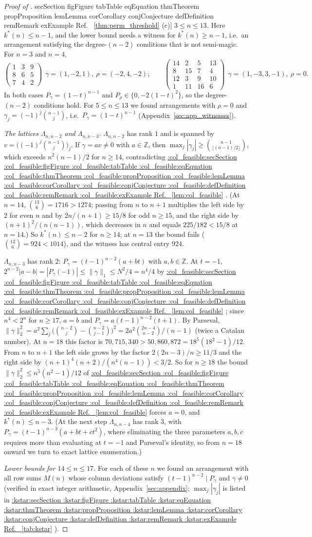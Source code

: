 \documentclass[11pt,a4paper]{article}
\makeatletter
\def\Cref@getprefix#1:#2\relax{#1}
\def\Cref@prefix@sec{sec}
\def\Cref@prefix@fig{fig}
\def\Cref@prefix@tab{tab}
\def\Cref@prefix@eq{eq}
\def\Cref@prefix@thm{thm}
\def\Cref@prefix@prop{prop}
\def\Cref@prefix@lem{lem}
\def\Cref@prefix@cor{cor}
\def\Cref@prefix@conj{conj}
\def\Cref@prefix@def{def}
\def\Cref@prefix@rem{rem}
\def\Cref@prefix@ex{ex}
\def\Cref@type@cap#1{%
  \edef\Cref@tmp{#1}%
  \ifx\Cref@tmp\Cref@prefix@sec Section%
  \else\ifx\Cref@tmp\Cref@prefix@fig Figure%
  \else\ifx\Cref@tmp\Cref@prefix@tab Table%
  \else\ifx\Cref@tmp\Cref@prefix@eq Equation%
  \else\ifx\Cref@tmp\Cref@prefix@thm Theorem%
  \else\ifx\Cref@tmp\Cref@prefix@prop Proposition%
  \else\ifx\Cref@tmp\Cref@prefix@lem Lemma%
  \else\ifx\Cref@tmp\Cref@prefix@cor Corollary%
  \else\ifx\Cref@tmp\Cref@prefix@conj Conjecture%
  \else\ifx\Cref@tmp\Cref@prefix@def Definition%
  \else\ifx\Cref@tmp\Cref@prefix@rem Remark%
  \else\ifx\Cref@tmp\Cref@prefix@ex Example%
  \else Ref.%
  \fi\fi\fi\fi\fi\fi\fi\fi\fi\fi\fi\fi
}
\DeclareRobustCommand{\Cref}[1]{%
  \begingroup
  \edef\Cref@label{#1}%
  \edef\Cref@prefix{\expandafter\Cref@getprefix\Cref@label:\relax}%
  \hyperref[#1]{\Cref@type@cap{\Cref@prefix}~\ref*{#1}}%
  \endgroup
}
\theoremstyle{plain}
\theoremstyle{definition}
\theoremstyle{remark}
\newcommand{\Z}{\mathbb{Z}}
\makeatother
\begin{document}
\begin{proof}[Proof of \Cref{thm:perm_threshold}(c)]
\emph{$3\le n\le13$.}  Here $k^*(n)\le n-1$, and the lower bound needs a witness for $k^*(n)\ge n-1$, i.e.\ an arrangement satisfying the degree-$(n-2)$ conditions that is not semi-magic.  For $n=3$ and $n=4$,
\[
\begin{pmatrix}1&3&9\\8&6&5\\7&4&2\end{pmatrix}\ \ \gamma=(1,-2,1),\ \rho=(-2,4,-2);\qquad
\begin{pmatrix}14&2&5&13\\8&15&7&4\\12&3&9&10\\1&11&16&6\end{pmatrix}\ \ \gamma=(1,-3,3,-1),\ \rho=0.
\]
In both cases $P_\gamma=(1-t)^{n-1}$ and $P_\rho\in\{0,-2(1-t)^2\}$, so the degree-$(n-2)$ conditions hold.
For $5\le n\le13$ we found arrangements with $\rho=0$ and $\gamma_j=(-1)^j\binom{n-1}j$, i.e.\ $P_\gamma=(1-t)^{n-1}$ (Appendix~\ref{sec:app_witnesses}).

\emph{The lattices $\Lambda_{n,n-2}$ and $\Lambda_{n,n-3}$.}  $\Lambda_{n,n-2}$ has rank $1$ and is spanned by $v=\bigl((-1)^j\binom{n-1}j\bigr)_j$.  If $\gamma=av\ne0$ with $a\in\Z$, then $\max_j|\gamma_j|\ge\binom{n-1}{\lfloor(n-1)/2\rfloor}$, which exceeds $n^2(n-1)/2$ for $n\ge14$, contradicting \Cref{lem:col_feasible}.
(At $n=14$, $\binom{13}6=1716>1274$; passing from $n$ to $n+1$ multiplies the left side by $2$ for even $n$ and by $2n/(n+1)\ge15/8$ for odd $n\ge15$, and the right side by $(n+1)^2/(n(n-1))$, which decreases in $n$ and equals $225/182<15/8$ at $n=14$.)
So $k^*(n)\le n-2$ for $n\ge14$; at $n=13$ the bound fails ($\binom{12}6=924<1014$), and the witness has central entry $924$.

$\Lambda_{n,n-3}$ has rank $2$: $P_\gamma=(t-1)^{n-2}(a+bt)$ with $a,b\in\Z$.
At $t=-1$, $2^{n-2}|a-b|=|P_\gamma(-1)|\le\|\gamma\|_1\le N^2/4=n^4/4$ by \Cref{lem:col_feasible}; since $n^4<2^n$ for $n\ge17$, $a=b$ and $P_\gamma=a(t-1)^{n-2}(t+1)$.
By Parseval, $\|\gamma\|_2^2=a^2\sum_j\bigl(\binom{n-2}j-\binom{n-2}{j-1}\bigr)^2=2a^2\binom{2n-4}{n-2}/(n-1)$ (twice a Catalan number).
At $n=18$ this factor is $70{,}715{,}340>50{,}860{,}872=18^5(18^2-1)/12$.
From $n$ to $n+1$ the left side grows by the factor $2(2n-3)/n\ge11/3$ and the right side by $(n+1)^4(n+2)/(n^4(n-1))<3/2$.
So for $n\ge18$ the bound $\|\gamma\|_2^2\le n^5(n^2-1)/12$ of \Cref{lem:col_feasible} forces $a=0$, and $k^*(n)\le n-3$.
(At the next step $\Lambda_{n,n-4}$ has rank $3$, with $P_\gamma=(t-1)^{n-3}(a+bt+ct^2)$, where eliminating the three parameters $a,b,c$ requires more than evaluating at $t=-1$ and Parseval's identity, so from $n=18$ onward we turn to exact lattice enumeration.)

\emph{Lower bounds for $14\le n\le17$.}  For each of these $n$ we found an arrangement with all row sums $M(n)$ whose column deviations satisfy $(t-1)^{n-2}\mid P_\gamma$ and $\gamma\ne0$ (verified in exact integer arithmetic, Appendix~\ref{sec:appendix}; $\max_j|\gamma_j|$ is listed in \Cref{tab:kstar}).
\end{proof}
\end{document}
